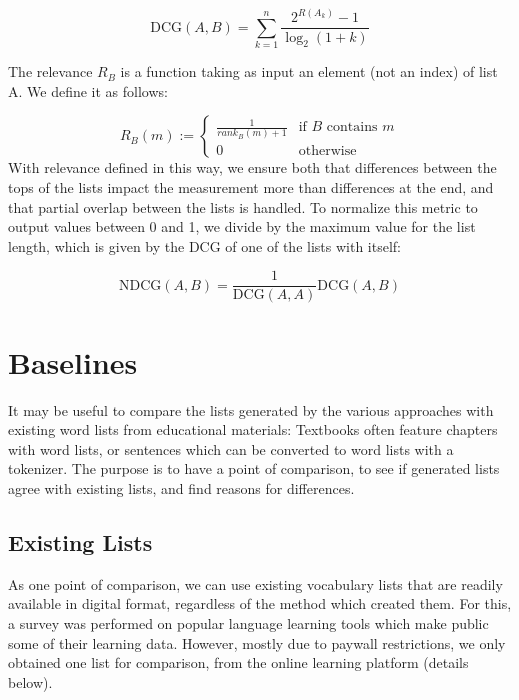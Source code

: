 



\[
	\text{DCG}(A, B) = \sum_{k=1}^{n} \frac{2^{R(A_k)} - 1}{\log_2(1 + k)}
\]

The relevance $R_B$ is a function taking as input an element (not an index) of list A.
We define it as follows:

\[
	R_B(m) :=
	\begin{cases}
		\frac{1}{rank_{B}(m) + 1} & \text{if } B \text{ contains } m \\
		0                         & \text{otherwise}
	\end{cases}
\]
With relevance defined in this way, we ensure both that differences between the tops of the lists impact the measurement more than differences at the end, and that partial overlap between the lists is handled.
To normalize this metric to output values between 0 and 1, we divide by the maximum value for the list length, which is given by the DCG of one of the lists with itself:

\[
	\text{NDCG}(A,B) = \frac{1}{\text{DCG}(A, A)} \text{DCG}(A, B)
\]


\section{Baselines}
It may be useful to compare the lists generated by the various approaches with existing word lists from educational materials:
Textbooks often feature chapters with word lists, or sentences which can be converted to word lists with a tokenizer.
The purpose is to have a point of comparison, to see if generated lists agree with existing lists, and find reasons for differences.

\subsection{Existing Lists}
As one point of comparison, we can use existing vocabulary lists that are readily available in digital format, regardless of the method which created them.
For this, a survey was performed on popular language learning tools which make public some of their learning data.
However, mostly due to paywall restrictions, we only obtained one list for comparison, from the online learning platform \Rosetta (details below).


